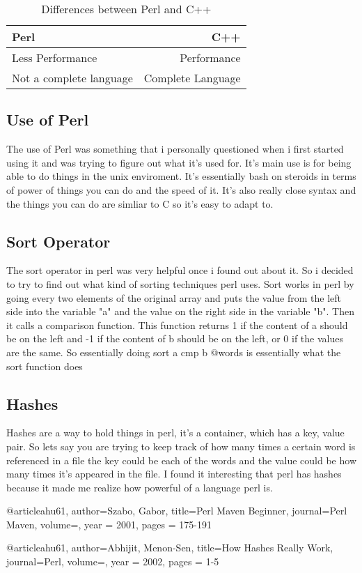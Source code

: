 \documentclass[a4paper,11pt]{article}
\begin{document}
\begin{table}
\centering
\begin{tabular}{l|r}
Perl & C++ \\\hline
Less Performance & Performance \\
Not a complete language & Complete Language
\end{tabular}
\caption{\label{tab:widgets}Differences between Perl and C++}
\end{table}


\subsection{Use of Perl}

The use of Perl was something that i personally questioned when i first started using it and was trying to figure out what it's used for. It's main use is for being able to do things in the unix enviroment. It's essentially bash on steroids in terms of power of things you can do and the speed of it. It's also really close syntax and the things you can do are simliar to C so it's easy to adapt to. 



\subsection{Sort Operator}

The sort operator in perl was very helpful once i found out about it.  So i decided to try to find out what kind of sorting techniques perl uses. Sort works in perl by going every two elements of the original array and puts the value from the left side into the variable "a" and the value on the right side in the variable "b". Then it calls a comparison function. This function returns 1 if the content of a should be on the left and -1 if the content of b should be on the left, or 0 if the values are the same. So essentially doing sort { a cmp b } @words is essentially what the sort function does 

\subsection{Hashes}
Hashes are a way to hold things in perl, it's a container, which has a key, value pair. So lets say you are trying to keep track of how many times a certain word is referenced in a file  the key could be each of the words and the value could be how many times it's appeared in the file. I found it interesting that perl has hashes because it made me realize how powerful of a language perl is.\newline \newline 



@article{ahu61,
       author={Szabo, Gabor},
       title={Perl Maven Beginner},
       journal={Perl Maven},
       volume={},
       year = 2001,
       pages = {175-191}
     }
     
     
@article{ahu61,
       author={Abhijit, Menon-Sen},
       title={How Hashes Really Work},
       journal={Perl},
       volume={},
       year = 2002,
       pages = {1-5}
     }
\end{document}
